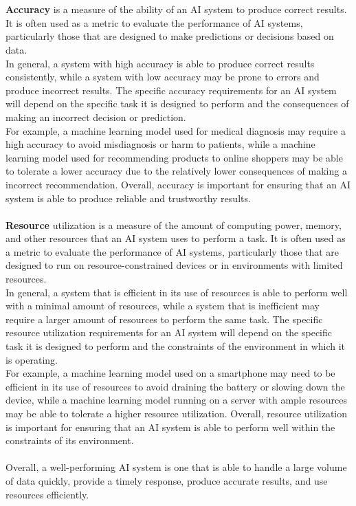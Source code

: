 \\
\\
\textbf{Accuracy} is a measure of the ability of an AI system to produce correct results.
It is often used as a metric to evaluate the performance of AI systems, particularly
those that are designed to make predictions or decisions based on data.
\\
In general, a system with high accuracy is able to produce correct results consistently,
while a system with low accuracy may be prone to errors and produce incorrect results.
The specific accuracy requirements for an AI system will depend on the specific task it is
designed to perform and the consequences of making an incorrect decision or prediction.
\\
For example, a machine learning model used for medical diagnosis may require a
high accuracy to avoid misdiagnosis or harm to patients, while a machine learning model
used for recommending products to online shoppers may be able to tolerate a lower accuracy due to
the relatively lower consequences of making a incorrect recommendation. Overall, accuracy is important for 
ensuring that an AI system is able to produce reliable and trustworthy results.
\\
\\
\textbf{Resource} utilization is a measure of the amount of computing power, memory, and other 
resources that an AI system uses to perform a task.
It is often used as a metric to evaluate the performance of AI systems, particularly those that 
are designed to run on resource-constrained devices or in environments with limited resources.
\\
In general, a system that is efficient in its use of resources is able to perform well with a 
minimal amount of resources, while a system that is inefficient may require a larger amount of 
resources to perform the same task. The specific resource utilization requirements for an AI system 
will depend on the specific task it is designed to perform and the constraints of the environment 
in which it is operating.
\\
For example, a machine learning model used on a smartphone may need to be efficient in its use of 
resources to avoid draining the battery or slowing down the device, while a machine learning model 
running on a server with ample resources may be able to tolerate a higher resource utilization. 
Overall, resource utilization is important for ensuring that an AI system is able to perform well within 
the constraints of its environment.
\\
\\
Overall, a well-performing AI system is one that is able to handle a 
large volume of data quickly, provide a timely response, produce accurate 
results, and use resources efficiently.

